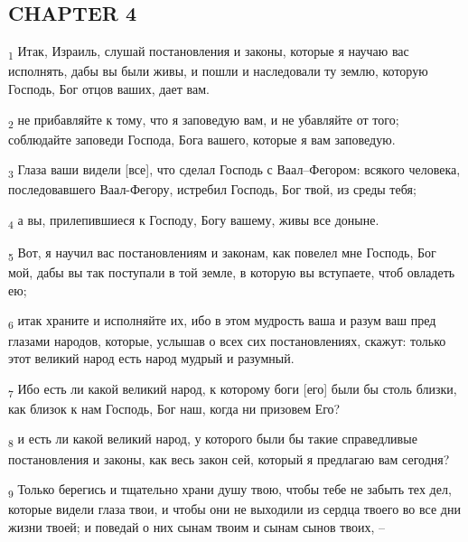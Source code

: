 \subsection{CHAPTER 4}
\begin{tcolorbox}
\textsubscript{1} Итак, Израиль, слушай постановления и законы, которые я научаю вас исполнять, дабы вы были живы, и пошли и наследовали ту землю, которую Господь, Бог отцов ваших, дает вам.
\end{tcolorbox}
\begin{tcolorbox}
\textsubscript{2} не прибавляйте к тому, что я заповедую вам, и не убавляйте от того; соблюдайте заповеди Господа, Бога вашего, которые я вам заповедую.
\end{tcolorbox}
\begin{tcolorbox}
\textsubscript{3} Глаза ваши видели [все], что сделал Господь с Ваал--Фегором: всякого человека, последовавшего Ваал-Фегору, истребил Господь, Бог твой, из среды тебя;
\end{tcolorbox}
\begin{tcolorbox}
\textsubscript{4} а вы, прилепившиеся к Господу, Богу вашему, живы все доныне.
\end{tcolorbox}
\begin{tcolorbox}
\textsubscript{5} Вот, я научил вас постановлениям и законам, как повелел мне Господь, Бог мой, дабы вы так поступали в той земле, в которую вы вступаете, чтоб овладеть ею;
\end{tcolorbox}
\begin{tcolorbox}
\textsubscript{6} итак храните и исполняйте их, ибо в этом мудрость ваша и разум ваш пред глазами народов, которые, услышав о всех сих постановлениях, скажут: только этот великий народ есть народ мудрый и разумный.
\end{tcolorbox}
\begin{tcolorbox}
\textsubscript{7} Ибо есть ли какой великий народ, к которому боги [его] были бы столь близки, как близок к нам Господь, Бог наш, когда ни призовем Его?
\end{tcolorbox}
\begin{tcolorbox}
\textsubscript{8} и есть ли какой великий народ, у которого были бы такие справедливые постановления и законы, как весь закон сей, который я предлагаю вам сегодня?
\end{tcolorbox}
\begin{tcolorbox}
\textsubscript{9} Только берегись и тщательно храни душу твою, чтобы тебе не забыть тех дел, которые видели глаза твои, и чтобы они не выходили из сердца твоего во все дни жизни твоей; и поведай о них сынам твоим и сынам сынов твоих, --
\end{tcolorbox}
